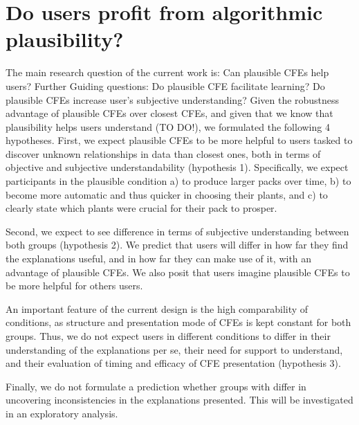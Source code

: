 \section{Do users profit from algorithmic plausibility?}\label{sec:hypotheses}


\textcolor{ACMDarkBlue}{
The main research question of the current work is: Can plausible \glspl{CFE} help users?
}
\textcolor{ACMDarkBlue}{
Further Guiding questions:
Do plausible \gls{CFE} facilitate learning?
Do plausible \glspl{CFE} increase user's subjective understanding?
Given the robustness advantage of plausible \glspl{CFE} over closest \glspl{CFE}, and given that we know that plausibility helps users understand (TO DO!), we formulated the following 4 hypotheses.
}
First, we expect plausible \glspl{CFE} to be more helpful to users tasked to discover unknown relationships in data than closest ones, both in terms of objective and subjective understandability (hypothesis 1). 
Specifically, we expect participants in the plausible condition a) to produce larger packs over time, b) to become more automatic and thus quicker in choosing their plants, and c) to clearly state which plants were crucial for their pack to prosper. %

Second, we expect to see difference in terms of subjective understanding between both groups (hypothesis 2).
We predict that users will differ in how far they find the explanations useful, and in how far they can make use of it, with an advantage of plausible CFEs. %
We also posit that users imagine plausible CFEs to be more helpful for others users. %

An important feature of the current design is the high comparability of conditions, as structure and presentation mode of \glspl{CFE} is kept constant for both groups.
Thus, we do not expect users in different conditions to differ in their understanding of the explanations per se, their need for support to understand, and their evaluation of timing and efficacy of \gls{CFE} presentation (hypothesis 3).

Finally, we do not formulate a prediction whether groups with differ in uncovering inconsistencies in the explanations presented. This will be investigated in an exploratory analysis.%

